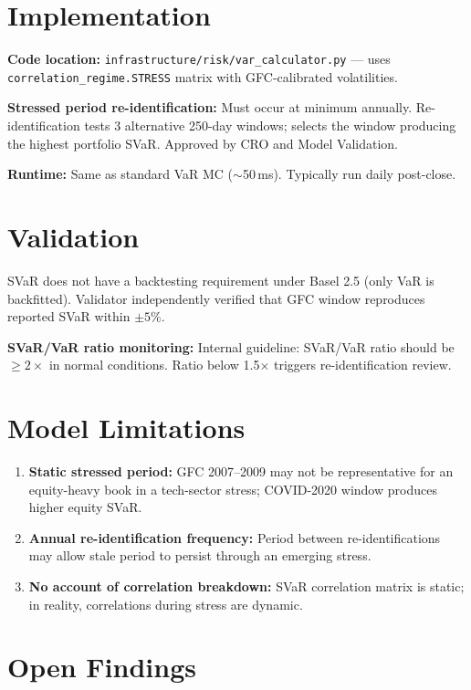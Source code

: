 \documentclass{apex_mdd}
\begin{document}
\section{Implementation}

\textbf{Code location:} \texttt{infrastructure/risk/var\_calculator.py} --- uses \texttt{correlation\_regime.STRESS} matrix with GFC-calibrated volatilities.

\textbf{Stressed period re-identification:} Must occur at minimum annually. Re-identification tests 3 alternative 250-day windows; selects the window producing the highest portfolio SVaR. Approved by CRO and Model Validation.

\textbf{Runtime:} Same as standard VaR MC ($\sim$50\,ms). Typically run daily post-close.

\section{Validation}

SVaR does not have a backtesting requirement under Basel 2.5 (only VaR is backfitted). Validator independently verified that GFC window reproduces reported SVaR within $\pm 5\%$.

\textbf{SVaR/VaR ratio monitoring:} Internal guideline: SVaR/VaR ratio should be $\geq 2\times$ in normal conditions. Ratio below 1.5$\times$ triggers re-identification review.

\section{Model Limitations}

\begin{enumerate}
  \item \textbf{Static stressed period:} GFC 2007--2009 may not be representative for an equity-heavy book in a tech-sector stress; COVID-2020 window produces higher equity SVaR.
  \item \textbf{Annual re-identification frequency:} Period between re-identifications may allow stale period to persist through an emerging stress.
  \item \textbf{No account of correlation breakdown:} SVaR correlation matrix is static; in reality, correlations during stress are dynamic.
\end{enumerate}

\section{Open Findings}

\begin{findings}
\end{findings}
\end{document}
